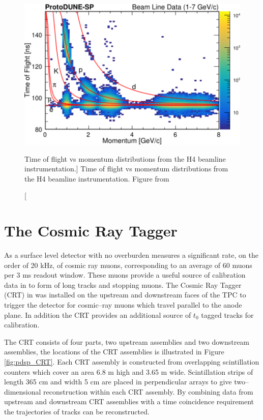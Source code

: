 \begin{figure}

	\centering

	\includegraphics[width=\textwidth]{figures/h4_tof.pdf}

	\caption
	[Time of flight vs momentum distributions from the H4 beamline
	instrumentation.]
	{Time of flight vs momentum distributions from the H4 beamline
	instrumentation. Figure from \cite{protoduneperf}}

	\label{fig:h4_tof}

\end{figure}

\section{The Cosmic Ray Tagger} \label{sec:pdsp_cosmic}

As a surface level detector with no overburden \protodune{} measures a
significant rate, on the order of 20 kHz, of cosmic ray muons, corresponding 
to an average of 60 muons per 3 ms readout window. These muons provide a 
useful source of calibration data in to form of long tracks and stopping muons. 
The Cosmic Ray Tagger (CRT) in \protodune{} was installed on the upstream and
downstream faces of the TPC to trigger the detector for cosmic--ray muons which
travel parallel to the anode plane. In addition the CRT provides an additional
source of $t_0$ tagged tracks for calibration.

The CRT consists of four parts, two upstream assemblies and two downstream
assemblies, the locations of the CRT assemblies is illustrated in Figure
\ref{fig:pdsp_CRT}. Each CRT assembly is constructed from overlapping 
scintillation counters which cover an area 6.8 m high and 3.65 m wide. 
Scintillation strips of length 365 cm and width 5 cm are placed in 
perpendicular arrays to give two--dimensional reconstruction within each CRT 
assembly. By combining data from upstream and downstream CRT assemblies with a 
time coincidence requirement the trajectories of tracks can be reconstructed.

